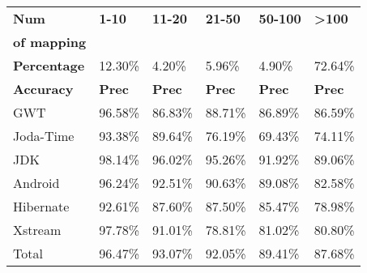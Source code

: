 \begin{table}[]
\begin{subtable}[t]{0.5\textwidth}
\begin{tabular}{|l|l|l|l|l|l|}
\textbf{Num }& \textbf{1-10}        & \textbf{11-20}       & \textbf{21-50}       & \textbf{50-100}      & \textbf{\textgreater{}100}     \\
\textbf{of mapping }&         &        &        &       &      \\ \hline
\textbf{Percentage  }   & 12.30\%     & 4.20\%      & 5.96\%      & 4.90\%      & 72.64\%               \\ \hline
\textbf{Accuracy }      & \textbf{Prec}        & \textbf{Prec}        & \textbf{Prec}        & \textbf{Prec}        & \textbf{Prec}                  \\ \hline
GWT            & 96.58\%     & 86.83\%     & 88.71\%     & 86.89\%     & 86.59\%               \\ \hline
Joda-Time      & 93.38\%     & 89.64\%     & 76.19\%     & 69.43\%     & 74.11\%               \\ \hline
JDK            & 98.14\%     & 96.02\%     & 95.26\%     & 91.92\%     & 89.06\%               \\ \hline
Android        & 96.24\%     & 92.51\%     & 90.63\%     & 89.08\%     & 82.58\%               \\ \hline
Hibernate      & 92.61\%     & 87.60\%     & 87.50\%     & 85.47\%     & 78.98\%               \\ \hline
Xstream        & 97.78\%     & 91.01\%     & 78.81\%     & 81.02\%     & 80.80\%               \\ \hline
Total          & 96.47\%     & 93.07\%     & 92.05\%     & 89.41\%     & 87.68\%               \\ \hline
\end{tabular}

\label{tbl:Analyze1}
\end{subtable}

\hfill
\end{table}

